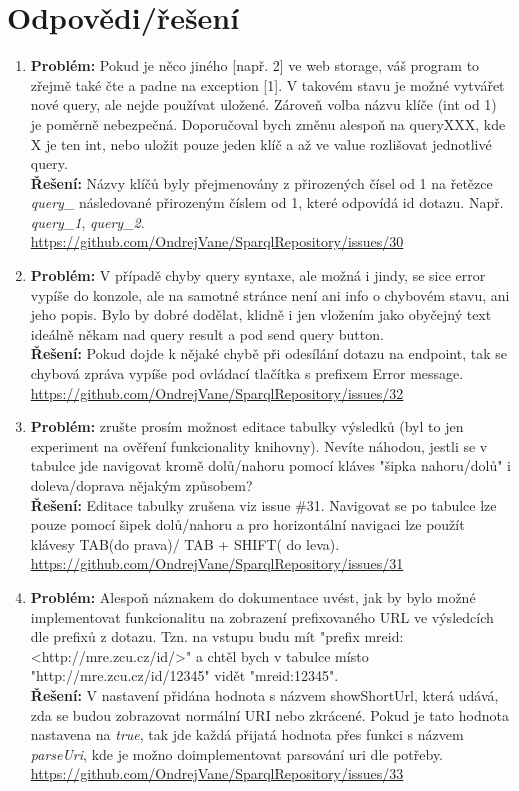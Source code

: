 \documentclass[
12pt,
a4paper,
pdftex,
czech,
titlepage
]{report}
\begin{document}
\section{Odpovědi/řešení} 
	\begin{enumerate}
		\item  \textbf{Problém:} Pokud je něco jiného [např. 2] ve web storage, váš program to zřejmě také čte a padne na exception [1]. V takovém stavu je možné vytvářet nové query, ale nejde používat uložené.
		Zároveň volba názvu klíče (int od 1) je poměrně nebezpečná. Doporučoval bych změnu alespoň na queryXXX, kde X je ten int, nebo uložit pouze jeden klíč a až ve value rozlišovat jednotlivé query.
		\\
		\textbf{Řešení:} Názvy klíčů byly přejmenovány z přirozených čísel od 1 na řetězce \textit{query\_} následované přirozeným číslem od 1, které odpovídá id dotazu. Např. \textit{query\_1}, \textit{query\_2}.
		\\
		\url{https://github.com/OndrejVane/SparqlRepository/issues/30}
		\item  \textbf{Problém:} V případě chyby query syntaxe, ale možná i jindy, se sice error vypíše do konzole, ale na samotné stránce není ani info o chybovém stavu, ani jeho popis. Bylo by dobré dodělat, klidně i jen vložením jako obyčejný text ideálně někam nad query result a pod send query button.
		\\
		\textbf{Řešení:} Pokud dojde k nějaké chybě při odesílání dotazu na endpoint, tak se chybová zpráva vypíše pod ovládací tlačítka s prefixem Error message.\\ \url{https://github.com/OndrejVane/SparqlRepository/issues/32}
		\item  \textbf{Problém:} zrušte prosím možnost editace tabulky výsledků (byl to jen experiment na ověření funkcionality knihovny). Nevíte náhodou, jestli se v tabulce jde navigovat kromě dolů/nahoru pomocí kláves "šipka nahoru/dolů" i doleva/doprava nějakým způsobem?
		\\
		\textbf{Řešení:} Editace tabulky zrušena viz issue \#31. Navigovat se po tabulce lze pouze pomocí šipek dolů/nahoru a pro horizontální navigaci lze použít klávesy TAB(do prava)/ TAB + SHIFT( do leva).
		\\
		\url{https://github.com/OndrejVane/SparqlRepository/issues/31}
		\item  \textbf{Problém:} Alespoň náznakem do dokumentace uvést, jak by bylo možné implementovat funkcionalitu na zobrazení prefixovaného URL ve výsledcích dle prefixů z dotazu. Tzn. na vstupu budu mít "prefix mreid: <http://mre.zcu.cz/id/>" a chtěl bych v tabulce místo\\ "http://mre.zcu.cz/id/12345" vidět "mreid:12345".
		\\
		\textbf{Řešení:} V nastavení přidána hodnota s názvem showShortUrl, která udává, zda se budou zobrazovat normální URI nebo zkrácené. Pokud je tato hodnota nastavena na \textit{true}, tak jde každá přijatá hodnota přes funkci s názvem \textit{parseUri}, kde je možno doimplementovat parsování uri dle potřeby.
		\\
		\url{https://github.com/OndrejVane/SparqlRepository/issues/33}
	\end{enumerate}
\end{document}
